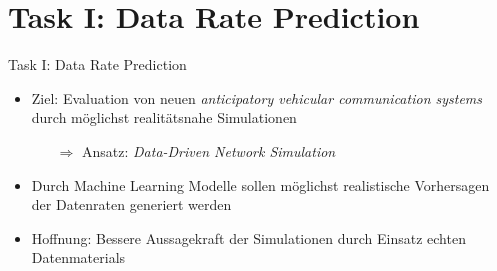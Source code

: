 \section{Task I: Data Rate Prediction}
\begin{frame}{Task I: Data Rate Prediction}
    \begin{itemize}
        \item Ziel: Evaluation von neuen \textit{anticipatory vehicular communication systems} durch m\"oglichst
            realit\"atsnahe Simulationen \cite{IEEE}
            \begin{itemize}
                \item[$\Rightarrow$] Ansatz: \textit{Data-Driven Network Simulation}
            \end{itemize}
        \item Durch Machine Learning Modelle sollen m\"oglichst realistische Vorhersagen der Datenraten generiert werden
        \item Hoffnung: Bessere Aussagekraft der Simulationen durch Einsatz echten Datenmaterials
    \end{itemize}
\end{frame}
